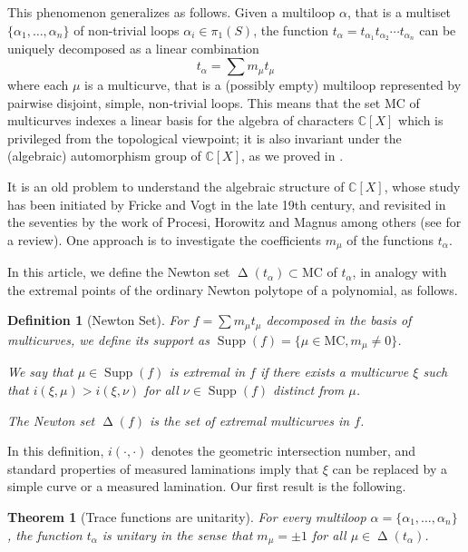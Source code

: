 \documentclass{amsart}
\newtheorem{theoremintro}{Theorem}
\newtheorem*{definition*}{Definition}
\newcommand{\C}{\mathbb{C}}
\newcommand{\MC}{\mathrm{MC}}
\DeclareMathOperator{\NewSet}{\Delta}
\DeclareMathOperator{\Supp}{Supp}
\begin{document}
This phenomenon generalizes as follows. Given a multiloop $\alpha$, that is a multiset $\{\alpha_1,\ldots,\alpha_n\}$ of non-trivial loops $\alpha_i\in \pi_1(S)$, the function $t_\alpha=t_{\alpha_1} t_{\alpha_2}\cdots t_{\alpha_n}$ can be uniquely decomposed as a linear combination  
\begin{equation}\label{decomposition}
t_\alpha=\sum m_\mu t_\mu
\end{equation}
where each $\mu$ is a multicurve, that is a (possibly empty) multiloop represented by pairwise disjoint, simple, non-trivial loops. This means that the set $\MC$ of multicurves indexes a linear basis for the algebra of characters $\C[X]$ which is privileged from the topological viewpoint; it is also invariant under the (algebraic) automorphism group of $\C[X]$, as we proved in \cite{MS_Aut(CV)_2020}.

It is an old problem to understand the algebraic structure of $\C[X]$, whose study has been initiated by Fricke and Vogt in the late 19th century, and revisited in the seventies by the work of Procesi, Horowitz and Magnus among others (see \cite{Magnus} for a review). 
%
One approach is to investigate the coefficients $m_\mu$ of the functions $t_\alpha$.

In this article, we define the Newton set $\NewSet(t_\alpha)\subset \MC$ of $t_\alpha$, in analogy with the extremal points of the ordinary Newton polytope of a polynomial, as follows.

\begin{definition*}[Newton Set]
For $f=\sum m_\mu t_\mu$ decomposed in the basis of multicurves, we define its support as $\Supp(f)=\{\mu\in \MC, m_\mu\ne 0\}$.

We say that $\mu\in \Supp(f)$ is extremal in $f$ if there exists a multicurve $\xi$ such that $i(\xi,\mu)>i(\xi,\nu)$ for all $\nu\in\Supp(f)$ distinct from $\mu$.

The Newton set $\NewSet(f)$ is the set of extremal multicurves in $f$.
\end{definition*} 

In this definition, $i(\cdot,\cdot)$ denotes the geometric intersection number, and standard properties of measured laminations imply that $\xi$ can be replaced by a simple curve or a measured lamination.
%
Our first result is the following.

\begin{theoremintro}[Trace functions are unitarity]
\label{ThmA}
For every multiloop $\alpha=\{\alpha_1,\ldots,\alpha_n\}$%
, the function $t_\alpha$ is unitary in the sense that $m_\mu=\pm 1$ for all $\mu\in \NewSet(t_\alpha)$. 
\end{theoremintro}
\end{document}
